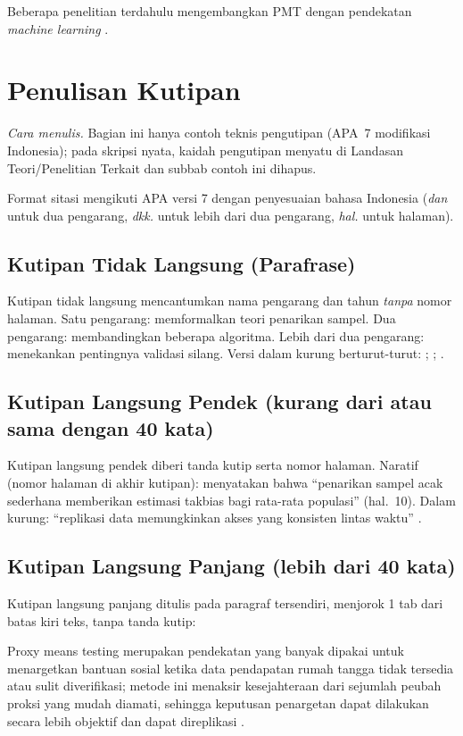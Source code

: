 Beberapa penelitian terdahulu mengembangkan PMT dengan pendekatan
\emph{machine learning} \parencite{etang2022,taufiq2021}.

\section{Penulisan Kutipan}
\emph{Cara menulis.} Bagian ini hanya contoh teknis pengutipan (APA~7 modifikasi Indonesia); pada skripsi nyata, kaidah pengutipan menyatu di Landasan Teori/Penelitian Terkait dan subbab contoh ini dihapus.

Format sitasi mengikuti APA versi 7 dengan penyesuaian bahasa Indonesia
(\emph{dan} untuk dua pengarang, \emph{dkk.} untuk lebih dari dua pengarang,
\emph{hal.} untuk halaman).

\subsection{Kutipan Tidak Langsung (Parafrase)}
Kutipan tidak langsung mencantumkan nama pengarang dan tahun \emph{tanpa} nomor
halaman. Satu pengarang: \textcite{cochran1991} memformalkan teori penarikan
sampel. Dua pengarang: \textcite{taufiq2021} membandingkan beberapa algoritma.
Lebih dari dua pengarang: \textcite{etang2022} menekankan pentingnya validasi
silang. Versi dalam kurung berturut-turut: \parencite{cochran1991};
\parencite{taufiq2021}; \parencite{etang2022}.

\subsection{Kutipan Langsung Pendek (kurang dari atau sama dengan 40 kata)}
Kutipan langsung pendek diberi tanda kutip serta nomor halaman. Naratif (nomor
halaman di akhir kutipan): \textcite{cochran1991} menyatakan bahwa ``penarikan
sampel acak sederhana memberikan estimasi takbias bagi rata-rata populasi''
(hal.~10). Dalam kurung: ``replikasi data memungkinkan akses yang konsisten
lintas waktu'' \parencite[hal.~781]{taufiq2021}.

\subsection{Kutipan Langsung Panjang (lebih dari 40 kata)}
Kutipan langsung panjang ditulis pada paragraf tersendiri, menjorok 1 tab dari
batas kiri teks, tanpa tanda kutip:
\begin{kutipanpanjang}
Proxy means testing merupakan pendekatan yang banyak dipakai untuk menargetkan
bantuan sosial ketika data pendapatan rumah tangga tidak tersedia atau sulit
diverifikasi; metode ini menaksir kesejahteraan dari sejumlah peubah proksi yang
mudah diamati, sehingga keputusan penargetan dapat dilakukan secara lebih objektif
dan dapat direplikasi \parencite[hal.~25]{etang2022}.
\end{kutipanpanjang}


